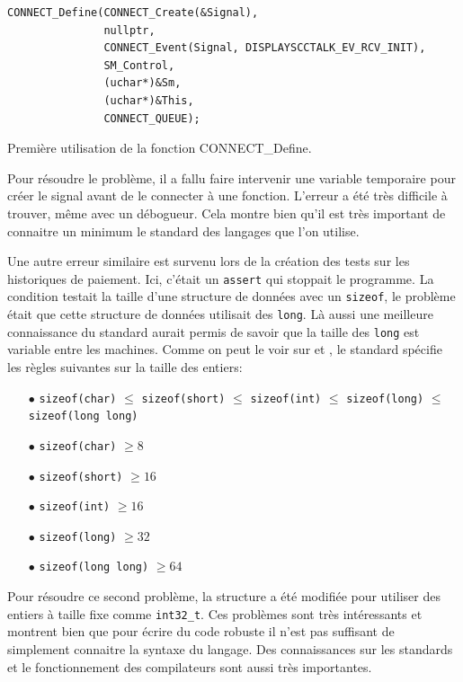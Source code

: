 \documentclass[a4paper]{article}
\begin{document}
\pagebreak
\begin{listing}[ht!]
\begin{verbatim}
CONNECT_Define(CONNECT_Create(&Signal),
               nullptr,
               CONNECT_Event(Signal, DISPLAYSCCTALK_EV_RCV_INIT),
               SM_Control,
               (uchar*)&Sm,
               (uchar*)&This,
               CONNECT_QUEUE);
\end{verbatim}
\caption{Première utilisation de la fonction CONNECT\_Define.}
\label{firstconnectdefine}
\end{listing}

Pour résoudre le problème, il a fallu faire intervenir une variable temporaire
pour créer le signal avant de le connecter à une fonction. L'erreur a été très
difficile à trouver, même avec un débogueur. Cela montre bien qu'il est très
important de connaitre un minimum le standard des langages que l'on utilise.

Une autre erreur similaire est survenu lors de la création des tests sur les
historiques de paiement. Ici, c'était un \verb|assert| qui stoppait le
programme. La condition testait la taille d'une structure de données avec un
\verb|sizeof|, le problème était que cette structure de données utilisait des
\verb|long|. Là aussi une meilleure connaissance du standard aurait permis de
savoir que la taille des \verb|long| est variable entre les machines. Comme on
peut le voir sur \cite{ISO:C99} et \cite{typescppref}, le standard spécifie les
règles suivantes sur la taille des entiers:

\begin{itemize}
  \item[$\bullet$] \verb|sizeof(char)| $\leq$ \verb|sizeof(short)| $\leq$ \verb|sizeof(int)| $\leq$ \verb|sizeof(long)| $\leq$ \verb|sizeof(long long)|
  \item[$\bullet$] \verb|sizeof(char)| $\geq 8$
  \item[$\bullet$] \verb|sizeof(short)| $\geq 16$
  \item[$\bullet$] \verb|sizeof(int)| $\geq 16$
  \item[$\bullet$] \verb|sizeof(long)| $\geq 32$
  \item[$\bullet$] \verb|sizeof(long long)| $\geq 64$
\end{itemize}

Pour résoudre ce second problème, la structure a été modifiée pour utiliser des
entiers à taille fixe comme \verb|int32_t|. Ces problèmes sont très
intéressants et montrent bien que pour écrire du code robuste il n'est pas
suffisant de simplement connaitre la syntaxe du langage. Des connaissances sur
les standards et le fonctionnement des compilateurs sont aussi très
importantes.\\
\end{document}
